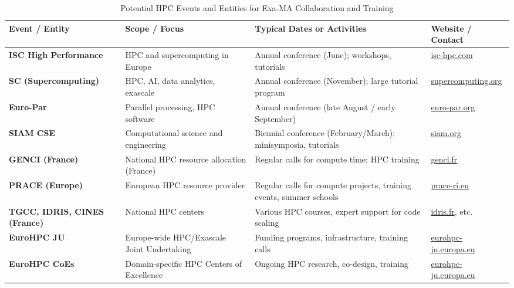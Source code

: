 \begin{table}[htbp]
    \centering
    \begin{tabular}{p{3.2cm} p{3.2cm} p{4.1cm} p{3.3cm}}
    \toprule
    \textbf{Event / Entity} & \textbf{Scope / Focus} & \textbf{Typical Dates or Activities} & \textbf{Website / Contact} \\
    \midrule

    \textbf{ISC High Performance} 
      & HPC and supercomputing in Europe 
      & Annual conference (June); workshops, tutorials 
      & \href{https://www.isc-hpc.com/}{isc-hpc.com} \\
    
    \textbf{SC (Supercomputing)} 
      & HPC, AI, data analytics, exascale 
      & Annual conference (November); large tutorial program 
      & \href{https://sc22.supercomputing.org/}{supercomputing.org} \\
    
    \textbf{Euro-Par} 
      & Parallel processing, HPC software 
      & Annual conference (late August / early September) 
      & \href{https://www.euro-par.org/}{euro-par.org} \\
    
    \textbf{SIAM CSE} 
      & Computational science and engineering 
      & Biennial conference (February/March); minisymposia, tutorials 
      & \href{https://www.siam.org/conferences/cm/conference/cse23}{siam.org} \\
    
    \textbf{GENCI (France)} 
      & National HPC resource allocation (France) 
      & Regular calls for compute time; HPC training 
      & \href{https://www.genci.fr/en}{genci.fr} \\
    
    \textbf{PRACE (Europe)} 
      & European HPC resource provider 
      & Regular calls for compute projects, training events, summer schools 
      & \href{https://prace-ri.eu/}{prace-ri.eu} \\
    
    \textbf{TGCC, IDRIS, CINES (France)} 
      & National HPC centers 
      & Various HPC courses, expert support for code scaling 
      & \href{https://www.idris.fr/}{idris.fr}, etc. \\
    
    \textbf{EuroHPC JU} 
      & Europe-wide HPC/Exascale Joint Undertaking 
      & Funding programs, infrastructure, training calls 
      & \href{https://eurohpc-ju.europa.eu/}{eurohpc-ju.europa.eu} \\

      \textbf{EuroHPC CoEs} 
      & Domain-specific HPC \newline Centers of Excellence 
      & Ongoing HPC research, \newline co-design, training 
      & \href{https://eurohpc-ju.europa.eu/activities/centres-excellence}{eurohpc-ju.europa.eu} \\
    
    
    \bottomrule
    \end{tabular}
    \caption{Potential HPC Events and Entities for Exa-MA Collaboration and Training}
    \label{tab:hpc-events-entities}
    \end{table}

